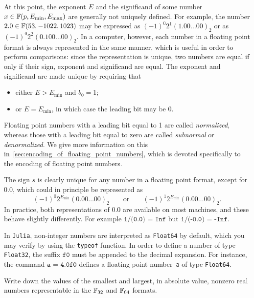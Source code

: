 At this point, the exponent $E$ and the significand of some number $x \in \mathbb F(p, E_{\min}, E_{\max})$ are generally not uniquely defined.
For example, the number $2.0 \in \mathbb F(53, -1022, 1023)$ may be expressed as $(-1)^0 2^1 (1.00\dots00)_2$ or as $(-1)^0 2^{2} (0.100\dots00)_2$.
In a computer, however, each number in a floating point format is always represented in the same manner,
which is useful in order to perform comparisons:
since the representation is unique,
two numbers are equal if only if their sign, exponent and significand are equal.
The exponent and significand are made unique by requiring that
\begin{itemize}
    \item either $E > E_{\min}$ and $b_0 = 1$;
    \item or $E = E_{\min}$, in which case the leading bit may be 0.
\end{itemize}
Floating point numbers with a leading bit equal to 1 are called \emph{normalized},
whereas those with a leading bit equal to zero are called \emph{subnormal} or \emph{denormalized}.
We give more information on this in~\cref{sec:encoding_of_floating_point_numbers},
which is devoted specifically to the encoding of floating point numbers.

\begin{remark}
    The sign $s$ is clearly unique for any number in a floating point format,
    except for $0.0$,
    which could in principle be represented as
    \[
        (-1)^0 2^{E_{\min}} (0.00\dots00)_2
        \qquad \text{or} \qquad
        (-1)^1 2^{E_{\min}} (0.00\dots00)_2.
    \]
    In practice, both representations of 0.0 are available on most machines,
    and these behave slightly differently.
    For example $\texttt{1/(0.0) = Inf}$ but $\texttt{1/(-0.0) = -Inf}$.
\end{remark}

In \texttt{Julia}, non-integer numbers are interpreted as \texttt{Float64} by default,
which you may verify by using the \texttt{typeof} function.
In order to define a number of type \texttt{Float32},
the suffix $\texttt{f0}$ must be appended to the decimal expansion.
For instance, the command $\texttt{a = 4.0f0}$ defines a floating point number~\texttt{a} of type \texttt{Float64}.

\begin{exercise}
    Write down the values of the smallest and largest, in absolute value,
    nonzero real numbers representable in the $\mathbb F_{32}$ and $\mathbb F_{64}$ formats.
\end{exercise}

